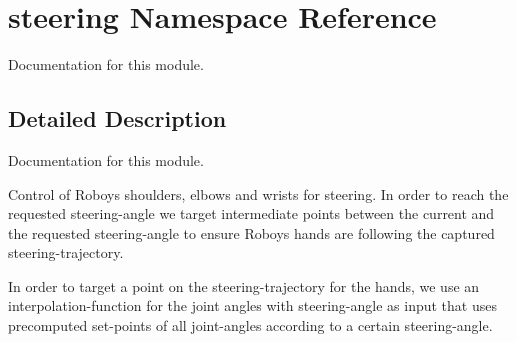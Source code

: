 \hypertarget{namespacesteering}{}\section{steering Namespace Reference}
\label{namespacesteering}


Documentation for this module.  




\subsection{Detailed Description}
Documentation for this module. 

Control of Roboys\textquotesingle{} shoulders, elbows and wrists for steering. In order to reach the requested steering-\/angle we target intermediate points between the current and the requested steering-\/angle to ensure Roboys\textquotesingle{} hands are following the captured steering-\/trajectory.

In order to target a point on the steering-\/trajectory for the hands, we use an interpolation-\/function for the joint angles with steering-\/angle as input that uses precomputed set-\/points of all joint-\/angles according to a certain steering-\/angle. 